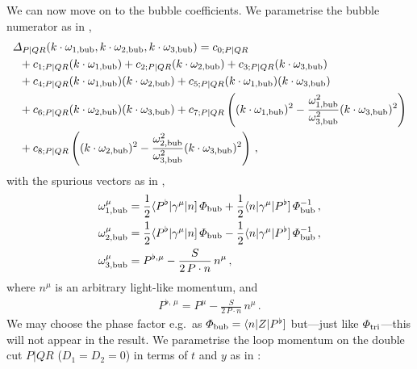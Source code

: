 \smallskip

We can now move on to the bubble coefficients. We parametrise the bubble numerator as in ,
\begin{align} 
\begin{aligned}
 & \Delta_{P|QR}(k\cdot\omega_{1,{\rm bub}}, k\cdot\omega_{2,{\rm bub}}, k\cdot\omega_{3,{\rm bub}}) = c_{0;P|QR} \\
 & \hspace{0.2cm} + c_{1;P|QR} (k\cdot\omega_{1,{\rm bub}}) 
  + c_{2;P|QR} (k\cdot\omega_{2,{\rm bub}}) 
  + c_{3;P|QR} (k\cdot\omega_{3,{\rm bub}}) \\ 
& \hspace{0.2cm} + c_{4;P|QR} (k\cdot\omega_{1,{\rm bub}}) (k\cdot\omega_{2,{\rm bub}}) 
  + c_{5;P|QR} (k\cdot\omega_{1,{\rm bub}}) (k\cdot\omega_{3,{\rm bub}}) \\
& \hspace{0.2cm} + c_{6;P|QR} (k\cdot\omega_{2,{\rm bub}}) (k\cdot\omega_{3,{\rm bub}})   
  + c_{7;P|QR} \left((k\cdot\omega_{1,{\rm bub}})^2 - \frac{\omega_{1,{\rm bub}}^2}{\omega_{3,{\rm bub}}^2} (k\cdot\omega_{3,{\rm bub}})^2 \right) \\
& \hspace{0.2cm} + c_{8;P|QR} \left((k\cdot\omega_{2,{\rm bub}})^2 - \frac{\omega_{2,{\rm bub}}^2}{\omega_{3,{\rm bub}}^2} (k\cdot\omega_{3,{\rm bub}})^2 \right) \,,
\end{aligned}
\end{align}
with the spurious vectors as in ,
\begin{align}
  \omega_{1,{\rm bub}}^\mu &= \frac{1}{2}\spAB{P^\flat}{\gamma^\mu}{n} \, \Phi_{\rm bub} + \frac{1}{2}\spAB{n}{\gamma^\mu}{P^\flat} \, \Phi_{\rm bub}^{-1} \,, \\ 
  \omega_{2,{\rm bub}}^\mu &= \frac{1}{2}\spAB{P^\flat}{\gamma^\mu}{n} \, \Phi_{\rm bub} - \frac{1}{2}\spAB{n}{\gamma^\mu}{P^\flat} \,  \Phi_{\rm bub}^{-1} \,,\\
  \omega_{3,{\rm bub}}^\mu &= P^{\flat,\mu} - \frac{S}{2 \, P\cdot n} \, n^\mu \,,
\end{align}
where $n^{\mu}$ is an arbitrary light-like momentum, and
\begin{align}
P^{\flat, \, \mu} = P^{\mu} - \frac{S}{2 \, P\cdot n} \, n^{\mu} \,.
\end{align}
We may choose the phase factor e.g.\ as $\Phi_{\rm bub} = \spAB{n}{Z}{P^\flat}$ but---just like $\Phi_{\rm tri}$---this will not appear in the result.
We parametrise the loop momentum on the double cut $P|QR$ ($D_1 = D_2 = 0$) in terms of $t$ and $y$ as in :
